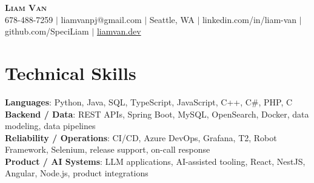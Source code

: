 \documentclass[letterpaper,11pt]{article}
\begin{document}

%
\begin{center}
    \textbf{\Huge \scshape Liam Van} \\ \vspace{1pt}
    \small 678-488-7259 $|$ \small {liamvanpj@gmail.com} $|$ Seattle, WA
 {{$|$ linkedin.com/in/liam-van} {$|$ github.com/SpeciLiam} {$|$ \href{https://liamvan.dev}{liamvan.dev}}}

\end{center}

\section{Technical Skills}
 \begin{itemize}[leftmargin=0.15in, label={}]
    \small{\item{
     \textbf{Languages}{: Python, Java, SQL, TypeScript, JavaScript, C++, C\#, PHP, C} \\
     \textbf{Backend / Data}{: REST APIs, Spring Boot, MySQL, OpenSearch, Docker, data modeling, data pipelines} \\
     \textbf{Reliability / Operations}{: CI/CD, Azure DevOps, Grafana, T2, Robot Framework, Selenium, release support, on-call response} \\
     \textbf{Product / AI Systems}{: LLM applications, AI-assisted tooling, React, NestJS, Angular, Node.js, product integrations} \\
    }}
 \end{itemize}
%

\end{document}
